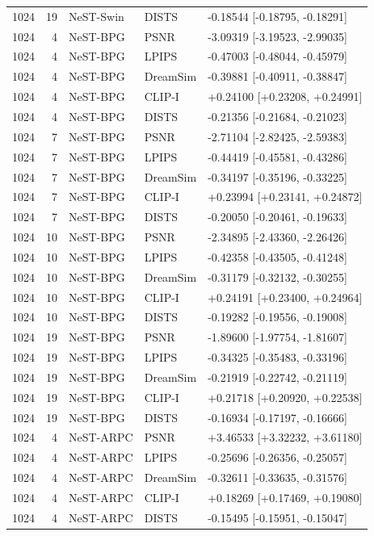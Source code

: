 \documentclass[10pt,letterpaper]{article}
\begin{document}
\begin{longtable}{@{}rrlll@{}}
1024 & 19 & NeST-Swin & DISTS & -0.18544 [-0.18795, -0.18291]\\
1024 & 4 & NeST-BPG & PSNR & -3.09319 [-3.19523, -2.99035]\\
1024 & 4 & NeST-BPG & LPIPS & -0.47003 [-0.48044, -0.45979]\\
1024 & 4 & NeST-BPG & DreamSim & -0.39881 [-0.40911, -0.38847]\\
1024 & 4 & NeST-BPG & CLIP-I & +0.24100 [+0.23208, +0.24991]\\
1024 & 4 & NeST-BPG & DISTS & -0.21356 [-0.21684, -0.21023]\\
1024 & 7 & NeST-BPG & PSNR & -2.71104 [-2.82425, -2.59383]\\
1024 & 7 & NeST-BPG & LPIPS & -0.44419 [-0.45581, -0.43286]\\
1024 & 7 & NeST-BPG & DreamSim & -0.34197 [-0.35196, -0.33225]\\
1024 & 7 & NeST-BPG & CLIP-I & +0.23994 [+0.23141, +0.24872]\\
1024 & 7 & NeST-BPG & DISTS & -0.20050 [-0.20461, -0.19633]\\
1024 & 10 & NeST-BPG & PSNR & -2.34895 [-2.43360, -2.26426]\\
1024 & 10 & NeST-BPG & LPIPS & -0.42358 [-0.43505, -0.41248]\\
1024 & 10 & NeST-BPG & DreamSim & -0.31179 [-0.32132, -0.30255]\\
1024 & 10 & NeST-BPG & CLIP-I & +0.24191 [+0.23400, +0.24964]\\
1024 & 10 & NeST-BPG & DISTS & -0.19282 [-0.19556, -0.19008]\\
1024 & 19 & NeST-BPG & PSNR & -1.89600 [-1.97754, -1.81607]\\
1024 & 19 & NeST-BPG & LPIPS & -0.34325 [-0.35483, -0.33196]\\
1024 & 19 & NeST-BPG & DreamSim & -0.21919 [-0.22742, -0.21119]\\
1024 & 19 & NeST-BPG & CLIP-I & +0.21718 [+0.20920, +0.22538]\\
1024 & 19 & NeST-BPG & DISTS & -0.16934 [-0.17197, -0.16666]\\
1024 & 4 & NeST-ARPC & PSNR & +3.46533 [+3.32232, +3.61180]\\
1024 & 4 & NeST-ARPC & LPIPS & -0.25696 [-0.26356, -0.25057]\\
1024 & 4 & NeST-ARPC & DreamSim & -0.32611 [-0.33635, -0.31576]\\
1024 & 4 & NeST-ARPC & CLIP-I & +0.18269 [+0.17469, +0.19080]\\
1024 & 4 & NeST-ARPC & DISTS & -0.15495 [-0.15951, -0.15047]\\

\end{longtable}
\end{document}
